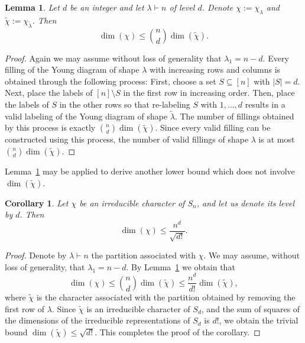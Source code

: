 \documentclass[11pt, letterpaper]{amsart}
\newtheorem{lem}[thm]{Lemma}
\newtheorem{cor}[thm]{Corollary}
\renewcommand\le{\leqslant}
\begin{document}
\begin{lem}\label{lem: dimension of characters converse}
Let $d$ be an integer and let $\lambda\vdash n$ of level $d$. Denote $\chi := \chi_\lambda$ and $\tilde{\chi} := \chi_{\tilde{\lambda}}$.
Then 
\[\dim(\chi) \le \binom{n}{d}\dim(\tilde{\chi}).\]
\end{lem}
\begin{proof}
Again we may assume without loss of generality that $\lambda_1 = n-d.$ %
Every filling of the Young diagram of shape $\lambda$ with increasing rows and columns is obtained through the following process: First, choose a set $S \subseteq [n]$ with $|S|=d$. Next, place the labels of $[n] \setminus S$ in the first row in increasing order. Then, place the labels of $S$ in the other rows so that re-labeling $S$ with $1,\ldots, d$ results in a valid labeling of the Young diagram of shape $\tilde{\lambda}$. The number of fillings obtained by this process is exactly $\binom{n}{d}\dim(\tilde{\chi})$. Since every valid filling can be constructed using this process, the number of valid fillings of shape $\lambda$ is at most $\binom{n}{d}\dim(\tilde{\chi})$.
\end{proof}

Lemma~\ref{lem: dimension of characters converse} may be applied to derive another lower bound which does not involve $\dim(\tilde{\chi})$.
\begin{cor}\label{cor: dimension of characters n over sqrt d}
    Let  $\chi$ be an irreducible character of $S_n$, and let us denote its level by $d$. Then
    \[\dim(\chi) \le \frac{n^d}{\sqrt{d!}}.\]
\end{cor}
\begin{proof}
    Denote by $\lambda \vdash n$ the partition associated with $\chi$. We may assume, without loss of generality, that $\lambda_1 = n-d$.
    By Lemma~\ref{lem: dimension of characters converse} we obtain that
    \[\dim(\chi) \le \binom{n}{d}\dim(\tilde{\chi}) \le \frac{n^{d}}{d!}\dim(\tilde{\chi}),\]
    where $\tilde{\chi}$ is the character associated with the partition obtained by removing the first row of $\lambda$. Since $\tilde{\chi}$ is an irreducible character of $S_d$, and the sum of squares of the dimensions of the irreducible representations of $S_d$ is $d!$, we obtain the trivial bound $\dim(\tilde{\chi}) \le \sqrt{d!}$. This completes the proof of the corollary.
\end{proof}
\end{document}
